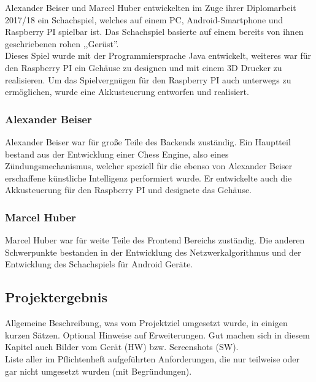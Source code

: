 \documentclass[12pt,a4paper]{article}
\newcommand{\cmnt}[1]{}			%
\newcommand{\yhbu}[0]{\color{ydkbu}}	%
\begin{document}
{	Alexander Beiser und Marcel Huber entwickelten im Zuge ihrer Diplomarbeit 2017/18 ein Schachspiel, welches auf einem PC, Android-Smartphone und Raspberry PI spielbar ist. Das Schachspiel basierte auf einem bereits von ihnen geschriebenen rohen ,,Gerüst''. \\
	Dieses Spiel wurde mit der Programmiersprache Java entwickelt, weiteres war für den Raspberry PI ein Gehäuse zu designen und mit einem 3D Drucker zu realisieren. Um das Spielvergnügen für den Raspberry PI auch unterwegs zu ermöglichen, wurde eine Akkusteuerung entworfen und realisiert. \\
	\subsubsection{Alexander Beiser}
	Alexander Beiser war für große Teile des Backends zuständig. Ein Hauptteil bestand aus der Entwicklung einer Chess Engine, also eines Zündungsmechanismus, welcher speziell für die ebenso von Alexander Beiser erschaffene künstliche Intelligenz performiert wurde. Er entwickelte auch die Akkusteuerung für den Raspberry PI und designete das Gehäuse.
	
	\subsubsection{Marcel Huber}
	Marcel Huber war für weite Teile des Frontend Bereichs zuständig. Die anderen Schwerpunkte bestanden in der Entwicklung des Netzwerkalgorithmus und der Entwicklung des Schachspiels für Android Geräte. 
 
	\vfill
	\newpage	
	
 \subsection{Projektergebnis}
	{\yhbu
	Allgemeine Beschreibung, was vom Projektziel umgesetzt wurde, in einigen kurzen Sätzen.
	Optional Hinweise auf Erweiterungen.
	Gut machen sich in diesem Kapitel auch Bilder vom Gerät (HW) bzw. Screenshots (SW).
	\\[1mm]
	Liste aller im Pflichtenheft aufgeführten Anforderungen,
	die nur teilweise oder gar nicht umgesetzt wurden (mit Begründungen).
	}










\clearpage\vfill\newpage
\cmnt{	
	\vspace*{-10mm}\noindent%
	{\Large\bf Inhaltsverzeichnis}\\
 \renewcommand{\theenumii}{\arabic{enumii}}
 \renewcommand{\labelenumii}{\theenumi.\theenumii}
 \renewcommand{\theenumiii}{\arabic{enumiii}}
 \renewcommand{\labelenumiii}{\theenumi.\theenumii.\theenumiii}

}}
\end{document}
